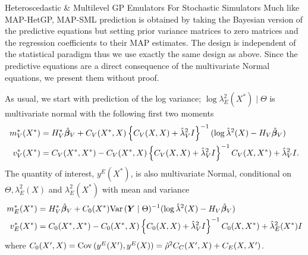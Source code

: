 \begin{chapter}{Heteroscedastic \& Multilevel GP Emulators For Stochastic Simulators\label{Ch:Hetsml}}
Much like MAP-HetGP, MAP-SML prediction is obtained by taking the Bayesian version of the predictive equations but setting prior variance matrices to zero matrices and the regression coefficients to their MAP estimates. The design is independent of the statistical paradigm thus we use exactly the same design as above. Since the predictive equations are a direct consequence of the multivariate Normal equations, we present them without proof.

As usual, we start with prediction of the log variance; $\log \lambda^2_E(X^*) \mid \Theta$ is multivariate normal with the following first two moments
\begin{align}
	m_V^*(X^*) &= H_V^* \hat{\bm{\beta}}_V + C_V(X^*, X) \left\{C_V(X, X) + \hat{\lambda}_V^2 I \right\}^{-1} (\log \hat{\lambda}^2 (X) - H_V\hat{\bm{\beta}}_V) \\
	v_V^*(X^*) &= C_V(X^*, X^*) - C_V(X^*, X) \left\{C_V(X, X) + \hat{\lambda}_V^2 I \right\}^{-1} C_V(X, X^*) + \hat{\lambda}^2_V I.
\end{align}
The quantity of interest, $y^E(X^*)$, is also multivariate Normal, conditional on $\Theta, \lambda^2_E(X)$ and $\lambda_E^2(X^*)$ with mean and variance
\begin{align}
	m_E^*(X^*) &= H_V^* \hat{\bm{\beta}}_V +C_0(X^*) \mathrm{Var}\,(\bm{Y} \mid \Theta)^{-1} (\log \hat{\lambda}^2 (X) - H_V\hat{\bm{\beta}}_V) \\
	v_E^*(X^*) &= C_0(X^*, X^*) - C_0(X^*, X) \left\{C_0(X, X) + \hat{\lambda}_V^2 I \right\}^{-1} C_0(X, X^*) + \hat{\lambda}^2_E(X^*)I
\end{align}
where $C_0(X', X) = \mathrm{Cov}\,(y^E(X'), y^E(X)) = \hat{\rho}^2C_C(X', X) + C_E(X, X')$.

\end{chapter}
